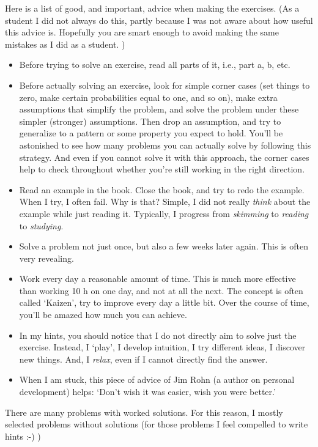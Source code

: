 \documentclass[a4paper]{article}
\theoremstyle{definition}
\newcommand{\1}[1]{\,I_{#1}} %
\begin{document}
Here is a list of good, and important, advice when making the exercises.
(As a student I did not always do this, partly because I was not aware about how useful this advice is. Hopefully you are smart enough to avoid making the same mistakes as I did as a student.
)
\begin{itemize}
\item Before trying to solve an exercise, read all parts of it, i.e., part a, b, etc.
\item Before actually solving  an exercise, look for simple corner cases (set things to zero, make certain probabilities equal to one, and so on), make extra assumptions that simplify the problem, and solve the problem under these simpler (stronger) assumptions. Then drop an assumption, and try to generalize to a pattern or some property you expect to hold. You'll be astonished to see how many problems you can actually solve by following this strategy. And even if you cannot solve it with this approach, the corner cases help to check throughout whether you're still working in the right direction.
\item Read an example in the book. Close the book, and try to redo the example. When I try, I often fail. Why is that? Simple, I did not really \emph{think} about the example while just reading it. Typically, I progress from \emph{skimming} to \emph{reading} to \emph{studying}.
\item Solve a problem not just once, but also a few weeks later again. This is often very revealing.
\item Work every day a reasonable amount of time. This is much more effective than working 10 h on one day, and not at all the next. The concept is often called `Kaizen', try to improve every day a little bit. Over the course of time, you'll be amazed how much you can achieve.
\item In my hints, you should notice that I do not directly aim to solve just the exercise. Instead, I `play', I develop intuition, I try different ideas, I discover new things. And, I \emph{relax}, even if I cannot directly find the answer.
\item When I am stuck, this piece of advice of Jim Rohn (a author on personal development) helps: `Don't wish it was easier, wish you were better.'
\end{itemize}



There are many problems with worked solutions. For this reason, I mostly selected problems without solutions (for those problems I feel compelled to write hints :-) )
\end{document}

